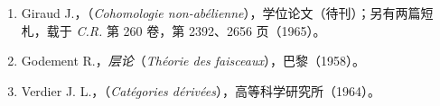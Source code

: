 \begin{enumerate}
\item[{[1]}] Giraud J.，\textit{}（\textit{Cohomologie non-abélienne}），学位论文（待刊）；另有两篇短札，载于 \textit{C.R.} 第 260 卷，第 2392、2656 页（1965）。
\item[{[2]}] Godement R.，\textit{层论}（\textit{Théorie des faisceaux}），巴黎（1958）。
\item[{[3]}] Verdier J. L.，\textit{}（\textit{Catégories dérivées}），高等科学研究所（1964）。
\end{enumerate}
